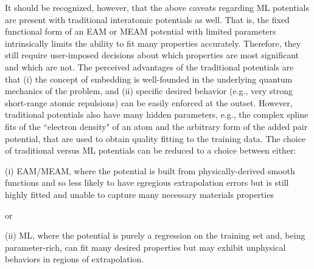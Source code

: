 \documentclass{article}
\begin{document}
It should be recognized, however, that the above caveats regarding ML potentials are present with traditional interatomic potentials as well.
That is, the fixed functional form of an EAM or MEAM potential with limited parameters intrinsically limits the ability to fit many properties accurately. 
Therefore, they still require user-imposed decisions about which properties are most significant and which are not.
The perceived advantages of the traditional potentials are that (i) the concept of embedding is well-founded in the underlying quantum mechanics of the problem, and (ii) specific desired behavior (e.g., very strong short-range atomic repulsions) can be easily enforced at the outset.
However, traditional potentials also have many hidden parameters, e.g., the complex spline fits of the ``electron density" of an atom and the arbitrary form of the added pair potential, that are used to obtain quality fitting to the training data.  The choice of traditional versus ML potentials can be reduced to a choice between either:

(i) EAM/MEAM, where the potential is built from physically-derived smooth functions and so less likely to have egregious extrapolation errors but is still highly fitted and unable to capture many necessary materials properties  

or

(ii) ML, where the potential is purely a regression on the training set and, being parameter-rich, can fit many desired properties but may exhibit unphysical behaviors in regions of extrapolation.
\end{document}

